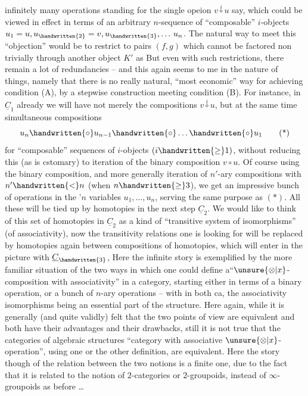 
infinitely many operations standing for the single opeion $v\overset{i}{\circ}u$ say, which could be viewed in effect in terms of an arbitrary $n$-sequence  of ``composable'' $i$-objects $u_1=u,u_{\handwritten{2}}=v,u_{\handwritten{3}},\ldots\,u_n$. The natural way to meet this ``objection'' would be to restrict to  pairs $(f,g)$ which cannot be factored non trivially through another object $K'$ as
But even with such restrictions, there remain a lot of redundancies -- and this again seems to me in the nature of things, namely that there is no really natural, ``most economic'' way for achieving condition (A), by a stepwise construction meeting condition (B). For instance, in $\underline{C}_1$ already we will have  not merely the compositions $v\overset{i}{\circ}u$, but at the same time simultaneous compositions
\[
u_n\handwritten{\circ}u_{n-1}\handwritten{\circ}\ldots\handwritten{\circ}u_1 \tag*{(*)}
\]
for ``composable'' sequences of $i$-objects $(i\handwritten{\geq}1)$, without reducing this (as is cstomary) to iteration of the binary composition $v\circ u$. Of course using the binary composition, and more generally iteration of $n'$-ary compositions with $n'\handwritten{<}n$ (when $n\handwritten{\geq}3$), we get an impressive bunch of operations in the '$n$ variables $u_1,\ldots,u_n$, serving the same purpose as $(*)$. All these will be tied up by homotopies in the next step $\underline{C}_2$. We would like to think of this set of homotopies in $\underline{C}_2$ as a kind of ``transitive system of isomorphisms'' (of associativity), now the transitivity relations one is looking for will be replaced by homotopies again between compositions of homotopies, which will enter in the picture with $\underline{C}_{\handwritten{3}}$,  Here the infinite story is exemplified by the more familiar situation of the two ways in which one could define a``$\unsure{\otimes|x}$-composition with associativity'' in a category,  starting either in terms of a binary operation, or  a bunch of $n$-ary operations -- with\handwritten{,} in both ca, the associativity isomorphisms being an essential part of the structure. Here again, while it is generally (and quite validly) felt that the two points of view are equivalent\unsure{;|,} and both have their advantages and their drawbacks, still it is not true  that the  categories of algebraic structures ``category with associative $\unsure{\otimes|x}$-operation'', using one or the other definition, are equivalent. Here the story though of the relation between the two notions is a finite one, due to the fact that it is related to the notion of $2$-categories or $2$-groupoids, instead of $\infty$-groupoids as before \ldots


